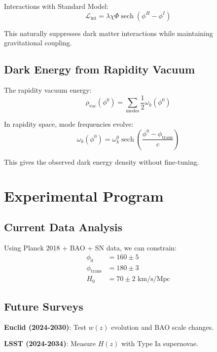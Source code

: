 \documentclass[12pt,a4paper]{article}
\begin{document}
Interactions with Standard Model:
\begin{equation}
\mathcal{L}_{\text{int}} = \lambda \chi \Phi \operatorname{sech}(\phi^H - \phi^I)
\end{equation}

This naturally suppresses dark matter interactions while maintaining gravitational coupling.

\subsection{Dark Energy from Rapidity Vacuum}

The rapidity vacuum energy:
\begin{equation}
\rho_{\text{vac}}(\phi^0) = \sum_{\text{modes}} \frac{1}{2} \omega_k(\phi^0)
\end{equation}

In rapidity space, mode frequencies evolve:
\begin{equation}
\omega_k(\phi^0) = \omega_k^0 \operatorname{sech}\left(\frac{\phi^0 - \phi_{\text{trans}}}{c}\right)
\end{equation}

This gives the observed dark energy density without fine-tuning.

\section{Experimental Program}

\subsection{Current Data Analysis}

Using Planck 2018 + BAO + SN data, we can constrain:
\begin{align}
\phi_0 &= 160 \pm 5 \\
\phi_{\text{trans}} &= 180 \pm 3 \\
H_0 &= 70 \pm 2 \text{ km/s/Mpc}
\end{align}

\subsection{Future Surveys}

\textbf{Euclid (2024-2030)}: Test $w(z)$ evolution and BAO scale changes.

\textbf{LSST (2024-2034)}: Measure $H(z)$ with Type Ia supernovae.
\end{document}
